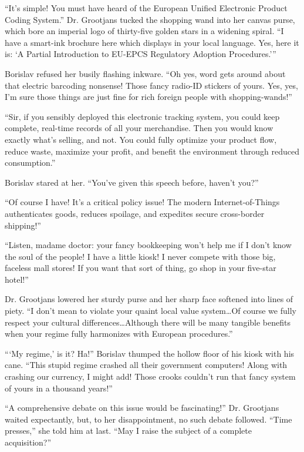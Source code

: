 \documentclass[20 pt,twoside,extrafontsizes,final]{memoir}
\begin{document}
``It's simple! You must have heard of the European Unified Electronic Product Coding System.'' Dr. Grootjans tucked the shopping wand into her canvas purse, which bore an imperial logo of thirty-five golden stars in a widening spiral. ``I have a smart-ink brochure here which displays in your local language. Yes, here it is:
`A Partial Introduction to EU-EPCS Regulatory Adoption Procedures.'''

Borislav refused her busily flashing inkware. ``Oh yes, word gets around about that electric barcoding nonsense! Those fancy radio-ID stickers of yours. Yes, yes, I'm sure those things are just fine for rich foreign people with shopping-wands!''

``Sir, if you sensibly deployed this electronic tracking system, you could keep complete, real-time records of all your merchandise. Then you would know exactly what's selling, and not. You could fully optimize your product flow, reduce waste, maximize your profit, and benefit the environment through reduced consumption.''

Borislav stared at her. ``You've given this speech before, haven't you?''

``Of course I have! It's a critical policy issue! The modern Internet-of-Things authenticates goods, reduces spoilage, and expedites secure cross-border shipping!''

``Listen, madame doctor: your fancy bookkeeping won't help me if I don't know the soul of the people! I have a little kiosk! I never compete with those big, faceless mall stores! If you want that sort of thing, go shop in your five-star hotel!''

Dr. Grootjans lowered her sturdy purse and her sharp face softened into lines of piety. ``I don't mean to violate your quaint local value system\dots Of course we fully respect your cultural differences\dots Although there will be many tangible benefits when your regime fully harmonizes with European procedures.''

```My regime,' is it? Ha!'' Borislav thumped the hollow floor of his kiosk with his cane. ``This stupid regime crashed all their government computers! Along with crashing our currency, I might add! Those crooks couldn't run that fancy system of yours in a thousand years!''

``A comprehensive debate on this issue would be fascinating!'' Dr. Grootjans waited expectantly, but, to her disappointment, no such debate followed. ``Time presses,'' she told him at last. ``May I raise the subject of a complete acquisition?''
\end{document}
